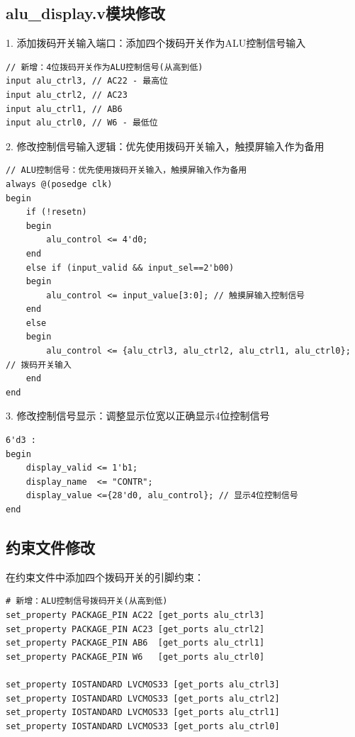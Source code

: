 \documentclass[12pt,a4paper]{article}
\begin{document}
\subsection{alu\_display.v模块修改}
1. 添加拨码开关输入端口：添加四个拨码开关作为ALU控制信号输入
\begin{lstlisting}
// 新增：4位拨码开关作为ALU控制信号(从高到低)
input alu_ctrl3, // AC22 - 最高位
input alu_ctrl2, // AC23
input alu_ctrl1, // AB6
input alu_ctrl0, // W6 - 最低位
\end{lstlisting}

2. 修改控制信号输入逻辑：优先使用拨码开关输入，触摸屏输入作为备用
\begin{lstlisting}
// ALU控制信号：优先使用拨码开关输入，触摸屏输入作为备用
always @(posedge clk)
begin
    if (!resetn)
    begin
        alu_control <= 4'd0;
    end
    else if (input_valid && input_sel==2'b00)
    begin
        alu_control <= input_value[3:0]; // 触摸屏输入控制信号
    end
    else
    begin
        alu_control <= {alu_ctrl3, alu_ctrl2, alu_ctrl1, alu_ctrl0}; // 拨码开关输入
    end
end
\end{lstlisting}

3. 修改控制信号显示：调整显示位宽以正确显示4位控制信号
\begin{lstlisting}
6'd3 :
begin
    display_valid <= 1'b1;
    display_name  <= "CONTR";
    display_value <={28'd0, alu_control}; // 显示4位控制信号
end
\end{lstlisting}

\subsection{约束文件修改}
在约束文件中添加四个拨码开关的引脚约束：
\begin{lstlisting}
# 新增：ALU控制信号拨码开关(从高到低)
set_property PACKAGE_PIN AC22 [get_ports alu_ctrl3]
set_property PACKAGE_PIN AC23 [get_ports alu_ctrl2]
set_property PACKAGE_PIN AB6  [get_ports alu_ctrl1]
set_property PACKAGE_PIN W6   [get_ports alu_ctrl0]

set_property IOSTANDARD LVCMOS33 [get_ports alu_ctrl3]
set_property IOSTANDARD LVCMOS33 [get_ports alu_ctrl2]
set_property IOSTANDARD LVCMOS33 [get_ports alu_ctrl1]
set_property IOSTANDARD LVCMOS33 [get_ports alu_ctrl0]
\end{lstlisting}

\end{document}
